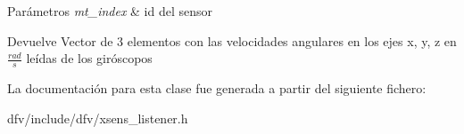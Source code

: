 \begin{DoxyParams}{\-Parámetros}
{\em mt\-\_\-index} & id del sensor \\
\hline
\end{DoxyParams}
\begin{DoxyReturn}{\-Devuelve}
\-Vector de 3 elementos con las velocidades angulares en los ejes x, y, z en $\frac{rad}{s}$ leídas de los giróscopos 
\end{DoxyReturn}


\-La documentación para esta clase fue generada a partir del siguiente fichero\-:\begin{DoxyCompactItemize}
\item 
dfv/include/dfv/xsens\-\_\-listener.\-h\end{DoxyCompactItemize}

